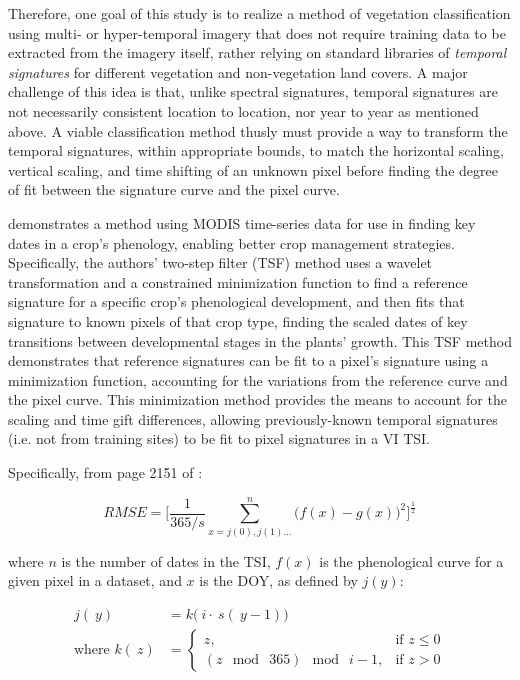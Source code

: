 Therefore, one goal of this study is to realize a method of vegetation classification using multi- or hyper-temporal imagery that does not require training data to be extracted from the imagery itself, rather relying on standard libraries of \textit{temporal signatures} for different vegetation and non-vegetation land covers. A major challenge of this idea is that, unlike spectral signatures, temporal signatures are not necessarily consistent location to location, nor year to year as mentioned above. A viable classification method thusly must provide a way to transform the temporal signatures, within appropriate bounds, to match the horizontal scaling, vertical scaling, and time shifting of an unknown pixel before finding the degree of fit between the signature curve and the pixel curve.

\textcites{sakamoto2005a-crop}{sakamoto2010a-two-step} demonstrates a method using MODIS time-series data for use in finding key dates in a crop’s phenology, enabling better crop management strategies. Specifically, the authors’ two-step filter (TSF) method uses a wavelet transformation and a constrained minimization function to find a reference signature for a specific crop’s phenological development, and then fits that signature to known pixels of that crop type, finding the scaled dates of key transitions between developmental stages in the plants’ growth. This TSF method demonstrates that reference signatures can be fit to a pixel’s signature using a minimization function, accounting for the variations from the reference curve and the pixel curve.  This minimization method provides the means to account for the scaling and time gift differences, allowing previously-known temporal signatures (i.e. not from training sites) to be fit to pixel signatures in a VI TSI.

Specifically, from page 2151 of \textcite{sakamoto2010a-two-step}:

\begin{equation}
\label{eq:1}
  RMSE = \biggl[\frac{1}{365/s}\sum_{x=j(0), j(1)…}^{n}\bigl(f\left(x\right)-g\left(x\right)\bigr)^{2}\biggr]^{\frac{1}{2}}
\end{equation}

where $n$ is the number of dates in the TSI, $f(x)$ is the phenological curve for a given pixel in a dataset, and $x$ is the DOY, as defined by $j(y)$:

\begin{subequations}
\label{eq:DOYcalc}
  \begin{align}
    j\left(~y\right) &= k\bigl(~i\cdot~s\left(~y - 1\right)\bigr) \label{eq:jofy}\\
    \text{where\ \ \ \ } k\left(~z\right) &=
    \begin{cases}
      z, & \mbox{if } z \leq 0\\
      \left(z\mod~365\right)\mod~i-1, & \mbox{if } z > 0
    \end{cases} \label{eq:kofz}
  \end{align}
\end{subequations}


